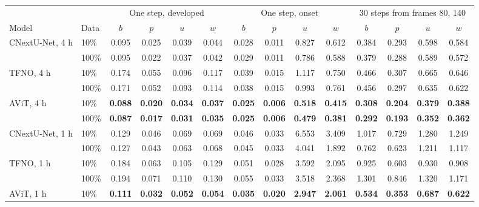\documentclass[11pt]{article}
\begin{document}
\begin{table}[tp]
\centering\footnotesize
\setlength{\tabcolsep}{3.0pt}
\begin{tabular}{@{}llcccccccccccc@{}}
\toprule
& & \multicolumn{4}{c}{One step, developed} & \multicolumn{4}{c}{One step, onset} & \multicolumn{4}{c}{30 steps from frames 80, 140} \\
\cmidrule(lr){3-6}\cmidrule(lr){7-10}\cmidrule(l){11-14}
Model & Data & $b$ & $p$ & $u$ & $w$ & $b$ & $p$ & $u$ & $w$ & $b$ & $p$ & $u$ & $w$ \\
\midrule
CNextU-Net, 4 h & 10\% & 0.095 & 0.025 & 0.039 & 0.044 & 0.028 & 0.011 & 0.827 & 0.612 & 0.384 & 0.293 & 0.598 & 0.584 \\
                & 100\% & 0.095 & 0.022 & 0.037 & 0.042 & 0.029 & 0.011 & 0.786 & 0.588 & 0.379 & 0.288 & 0.589 & 0.572 \\
TFNO, 4 h & 10\% & 0.174 & 0.055 & 0.096 & 0.117 & 0.039 & 0.015 & 1.117 & 0.750 & 0.466 & 0.307 & 0.665 & 0.646 \\
          & 100\% & 0.171 & 0.052 & 0.093 & 0.114 & 0.038 & 0.015 & 0.993 & 0.761 & 0.456 & 0.297 & 0.635 & 0.622 \\
AViT, 4 h & 10\% & \textbf{0.088} & \textbf{0.020} & \textbf{0.034} & \textbf{0.037} & \textbf{0.025} & \textbf{0.006} & \textbf{0.518} & \textbf{0.415} & \textbf{0.308} & \textbf{0.204} & \textbf{0.379} & \textbf{0.388} \\
          & 100\% & \textbf{0.087} & \textbf{0.017} & \textbf{0.031} & \textbf{0.035} & \textbf{0.025} & \textbf{0.006} & \textbf{0.479} & \textbf{0.381} & \textbf{0.292} & \textbf{0.193} & \textbf{0.352} & \textbf{0.362} \\
\midrule
CNextU-Net, 1 h & 10\% & 0.129 & 0.046 & 0.069 & 0.069 & 0.046 & 0.033 & 6.553 & 3.409 & 1.017 & 0.729 & 1.280 & 1.249 \\
                & 100\% & 0.127 & 0.043 & 0.063 & 0.068 & 0.045 & 0.033 & 4.041 & 1.892 & 0.762 & 0.623 & 1.211 & 1.117 \\
TFNO, 1 h & 10\% & 0.184 & 0.063 & 0.105 & 0.129 & 0.051 & 0.028 & 3.592 & 2.095 & 0.925 & 0.603 & 0.930 & 0.908 \\
          & 100\% & 0.194 & 0.071 & 0.110 & 0.130 & 0.055 & 0.033 & 3.518 & 2.368 & 1.301 & 0.846 & 1.320 & 1.171 \\
AViT, 1 h & 10\% & \textbf{0.111} & \textbf{0.032} & \textbf{0.052} & \textbf{0.054} & \textbf{0.035} & \textbf{0.020} & \textbf{2.947} & \textbf{2.061} & \textbf{0.534} & \textbf{0.353} & \textbf{0.687} & \textbf{0.622} \\

\end{tabular}
\end{table}
\end{document}
